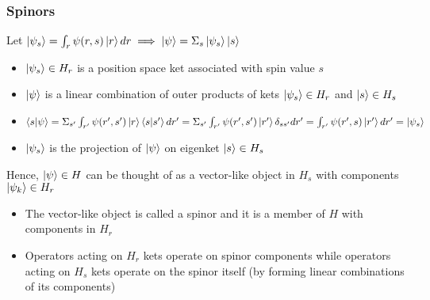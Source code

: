 \documentclass[8pt,t,mathserif,aspectratio=169]{beamer}
\begin{document}
 \begin{frame}
   \frametitle{Spinors}
   \vspace{1mm}
   Let $\ket{\psi_s} = \int_r \psi(r,s) \ket{r} dr \implies \ket{\psi} = \Sigma_s \ket{\psi_s} \ket{s}$
  \begin{itemize}
    \item $\ket{\psi_s} \in H_r$ is a position space ket associated with spin value $s$
    \item $\ket{\psi}$ is a linear combination of outer products of kets $\ket{\psi_s} \in H_r$ and $\ket{s} \in H_s$
    \item $\braket{s}{\psi} = \Sigma_{s'} \int_{r'} \psi(r',s') \ket{r} \braket{s}{s'} dr' = \Sigma_{s'} \int_{r'} \psi(r',s') \ket{r'} \delta_{ss'} dr' = \int_{r'} \psi(r',s) \ket{r'} dr' = \ket{\psi_s}$
    \item $\ket{\psi_s}$ is the projection of $\ket{\psi}$ on eigenket $\ket{s} \in H_s$
  \end{itemize}
   Hence, $\ket{\psi} \in H$ can be thought of as a vector-like object in $H_s$ with components $\ket{\psi_k} \in H_r$
   \begin{itemize}
     \item The vector-like object is called a spinor and it is a member of $H$ with components in $H_r$
     \item Operators acting on $H_r$ kets operate on spinor components while operators acting on $H_s$ kets operate on the spinor itself (by forming linear combinations of its components)
   \end{itemize}
 \end{frame}
\end{document}
